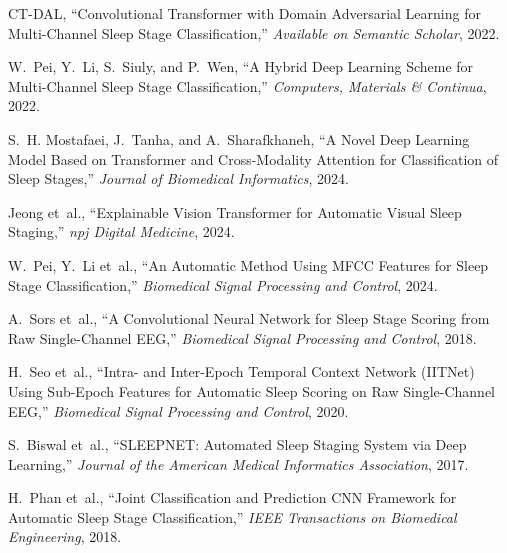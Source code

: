 \begin{thebibliography}{99}
	CT-DAL, ``Convolutional Transformer with Domain Adversarial Learning for Multi-Channel Sleep Stage Classification,'' \emph{Available on Semantic Scholar}, 2022.
	
	W.~Pei, Y.~Li, S.~Siuly, and P.~Wen, ``A Hybrid Deep Learning Scheme for Multi-Channel Sleep Stage Classification,'' \emph{Computers, Materials \& Continua}, 2022.
	
	S.~H. Mostafaei, J.~Tanha, and A.~Sharafkhaneh, ``A Novel Deep Learning Model Based on Transformer and Cross-Modality Attention for Classification of Sleep Stages,'' \emph{Journal of Biomedical Informatics}, 2024.
	
	Jeong et~al., ``Explainable Vision Transformer for Automatic Visual Sleep Staging,'' \emph{npj Digital Medicine}, 2024.
	
	W.~Pei, Y.~Li et~al., ``An Automatic Method Using MFCC Features for Sleep Stage Classification,'' \emph{Biomedical Signal Processing and Control}, 2024.
	
	A.~Sors et~al., ``A Convolutional Neural Network for Sleep Stage Scoring from Raw Single-Channel EEG,'' \emph{Biomedical Signal Processing and Control}, 2018.
	
	H.~Seo et~al., ``Intra- and Inter-Epoch Temporal Context Network (IITNet) Using Sub-Epoch Features for Automatic Sleep Scoring on Raw Single-Channel EEG,'' \emph{Biomedical Signal Processing and Control}, 2020.
	
	S.~Biswal et~al., ``SLEEPNET: Automated Sleep Staging System via Deep Learning,'' \emph{Journal of the American Medical Informatics Association}, 2017.
	
	H.~Phan et~al., ``Joint Classification and Prediction CNN Framework for Automatic Sleep Stage Classification,'' \emph{IEEE Transactions on Biomedical Engineering}, 2018.
	
\end{thebibliography}

